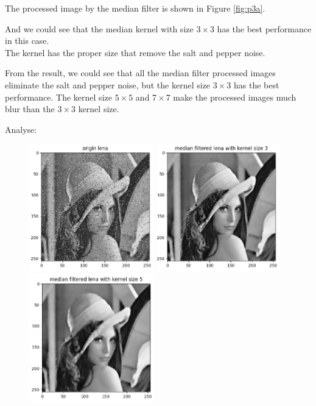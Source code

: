\problem{}
The processed image by the median filter is shown in Figure \ref{fig:p3a}.

And we could see that the median kernel with size $3 \times 3$ has the best performance in this case.\\
The kernel has the proper size that remove the salt and pepper noise.

From the result, we could see that all the median filter processed images eliminate the salt and pepper noise, but the kernel size $3 \times 3$ has the best performance. The kernel size $5 \times 5$ and $7 \times 7$ make the 
processed images much blur than the $3 \times 3$ kernel size.

Analyse:


\begin{figure}[htbp]
    \centering
	\includegraphics[width=0.48\textwidth]{../images/p3/p3_noisy.png}
	\includegraphics[width=0.48\textwidth]{../images/p3/p3a_3x3.png}
	\includegraphics[width=0.48\textwidth]{../images/p3/p3a_5x5.png}

\end{figure}
